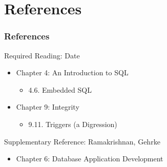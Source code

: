 \documentclass[dvipsnames]{beamer}
\theoremstyle{plain}
\begin{document}
%
%
%
%
%
%
%
%

\section*{References}

\begin{frame}
  \frametitle{References}

  \begin{block}{Required Reading: Date}
    \begin{itemize}
      \item Chapter 4: An Introduction to SQL
      \begin{itemize}
        \item 4.6. Embedded SQL
      \end{itemize}

      \item Chapter 9: Integrity
      \begin{itemize}
        \item 9.11. \alert{Triggers (a Digression)}
      \end{itemize}
    \end{itemize}
  \end{block}

  \begin{block}{Supplementary Reference: Ramakrishnan, Gehrke}
    \begin{itemize}
      \item Chapter 6: Database Application Development
    \end{itemize}
  \end{block}
\end{frame}
\end{document}
